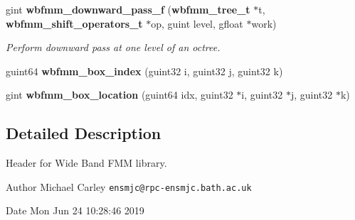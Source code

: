 \begin{DoxyCompactItemize}
gint {\bf wbfmm\+\_\+downward\+\_\+pass\+\_\+f} ({\bf wbfmm\+\_\+tree\+\_\+t} $\ast$t, {\bf wbfmm\+\_\+shift\+\_\+operators\+\_\+t} $\ast$op, guint level, gfloat $\ast$work)
\begin{DoxyCompactList}\small\item\em Perform downward pass at one level of an octree. \end{DoxyCompactList}\item 
guint64 {\bf wbfmm\+\_\+box\+\_\+index} (guint32 i, guint32 j, guint32 k)
\item 
gint {\bf wbfmm\+\_\+box\+\_\+location} (guint64 idx, guint32 $\ast$i, guint32 $\ast$j, guint32 $\ast$k)
\end{DoxyCompactItemize}


\subsection{Detailed Description}
Header for Wide Band F\+M\+M library. 

\begin{DoxyAuthor}{Author}
Michael Carley {\tt ensmjc@rpc-\/ensmjc.\+bath.\+ac.\+uk} 
\end{DoxyAuthor}
\begin{DoxyDate}{Date}
Mon Jun 24 10\+:28\+:46 2019 
\end{DoxyDate}
